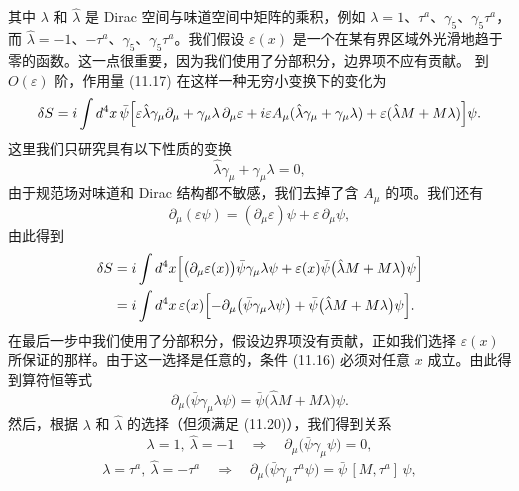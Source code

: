 其中 $\lambda$ 和 $\hat{\lambda}$ 是 Dirac 空间与味道空间中矩阵的乘积，例如 $\lambda = 1$、$\tau^a$、$\gamma_5$、$\gamma_5\tau^a$，而 $\hat{\lambda} = -1$、$-\tau^a$、$\gamma_5$、$\gamma_5\tau^a$。我们假设 $\varepsilon(x)$ 是一个在某有界区域外光滑地趋于零的函数。这一点很重要，因为我们使用了分部积分，边界项不应有贡献。
到 $O(\varepsilon)$ 阶，作用量 (11.17) 在这样一种无穷小变换下的变化为
\begin{equation}
\delta S = i \int d^4x\,
\bar{\psi}\Bigl[\varepsilon\hat{\lambda}\gamma_\mu\partial_\mu + \gamma_\mu\lambda\,\partial_\mu\varepsilon
+ i\varepsilon A_\mu(\hat{\lambda}\gamma_\mu + \gamma_\mu\lambda)
+ \varepsilon(\hat{\lambda}M + M\lambda)\Bigr]\psi .
\end{equation}
这里我们只研究具有以下性质的变换
\begin{equation}
\hat{\lambda}\gamma_\mu + \gamma_\mu\lambda = 0 ,
\end{equation}
由于规范场对味道和 Dirac 结构都不敏感，我们去掉了含 $A_\mu$ 的项。我们还有
\begin{equation}
\partial_\mu(\varepsilon\psi) = (\partial_\mu\varepsilon)\psi + \varepsilon\,\partial_\mu\psi ,
\end{equation}
由此得到
\begin{equation}
\begin{aligned}
\delta S &= i \int d^4x \Bigl[\bigl(\partial_\mu\varepsilon(x)\bigr)\bar{\psi}\gamma_\mu\lambda\psi
+ \varepsilon(x)\bar{\psi}\bigl(\hat{\lambda}M + M\lambda\bigr)\psi\Bigr] \\
&= i \int d^4x\, \varepsilon(x)\Bigl[-\partial_\mu\bigl(\bar{\psi}\gamma_\mu\lambda\psi\bigr)
+ \bar{\psi}\bigl(\hat{\lambda}M + M\lambda\bigr)\psi\Bigr] .
\end{aligned}
\end{equation}
在最后一步中我们使用了分部积分，假设边界项没有贡献，正如我们选择 $\varepsilon(x)$ 所保证的那样。由于这一选择是任意的，条件 (11.16) 必须对任意 $x$ 成立。由此得到算符恒等式
\begin{equation}
\partial_\mu\bigl(\bar{\psi}\gamma_\mu\lambda\psi\bigr) = \bar{\psi}\bigl(\hat{\lambda}M + M\lambda\bigr)\psi .
\end{equation}
然后，根据 $\lambda$ 和 $\hat{\lambda}$ 的选择（但须满足 (11.20)），我们得到关系
\begin{equation}
\lambda = 1,\ \hat{\lambda} = -1 \quad\Rightarrow\quad
\partial_\mu\bigl(\bar{\psi}\gamma_\mu\psi\bigr) = 0 ,
\end{equation}
\begin{equation}
\lambda = \tau^a,\ \hat{\lambda} = -\tau^a \quad\Rightarrow\quad
\partial_\mu\bigl(\bar{\psi}\gamma_\mu\tau^a\psi\bigr) = \bar{\psi}\,[M,\tau^a]\,\psi ,
\end{equation}
